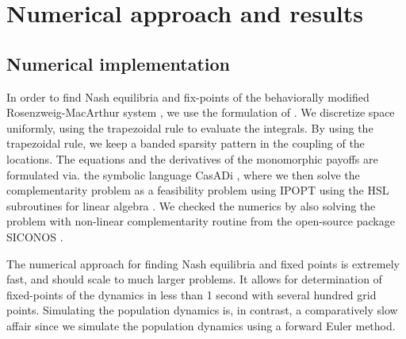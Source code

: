 \section{Numerical approach and results}
\subsection{Numerical implementation}
In order to find Nash equilibria and fix-points of the behaviorally modified Rosenzweig-MacArthur  system , we use the formulation of . We discretize space uniformly, using the trapezoidal rule to evaluate the integrals. By using the trapezoidal rule, we keep a banded sparsity pattern in the coupling of the locations. The equations  and the derivatives of the monomorphic payoffs  are formulated via. the symbolic language CasADi \citep{Andersson2019}, where we then solve the complementarity problem as a feasibility problem using IPOPT \citep{wachter2006implementation} using the HSL subroutines for linear algebra \citep{hsl2007collection}. We checked the numerics by also solving the problem with non-linear complementarity routine from the open-source package SICONOS \citep{acary2019introduction}.

The numerical approach for finding Nash equilibria and fixed points is extremely fast, and should scale to much larger problems. It allows for determination of fixed-points of the dynamics in less than 1 second with several hundred grid points. Simulating the population dynamics is, in contrast, a comparatively slow affair since we simulate the population dynamics using a forward Euler method.

